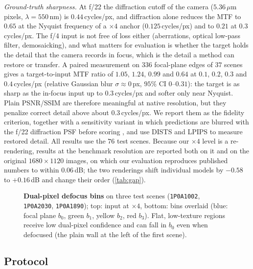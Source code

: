 \emph{Ground-truth sharpness.} At f/22 the diffraction cutoff of the camera ($5.36\,\mu$m pixels,
$\lambda=550$\,nm) is $0.44$\,cycles/px, and diffraction alone reduces the MTF to $0.65$ at the
Nyquist frequency of a $\times4$ anchor ($0.125$\,cycles/px) and to $0.21$ at $0.3$\,cycles/px. The
f/4 input is not free of loss either (aberrations, optical low-pass filter, demosaicking), and what
matters for evaluation is whether the target holds the detail that the camera records in focus, which
is the detail a method can restore or transfer. A paired measurement on $336$ focal-plane edges of
$37$ scenes gives a target-to-input MTF ratio of $1.05$, $1.24$, $0.99$ and $0.64$ at $0.1$, $0.2$,
$0.3$ and $0.4$\,cycles/px (relative Gaussian blur $\sigma\approx0$\,px, $95\%$ CI $0$--$0.31$): the
target is as sharp as the in-focus input up to $0.3$\,cycles/px and softer only near Nyquist. Plain
PSNR/SSIM are therefore meaningful at native resolution, but they penalize correct detail above about
$0.3$\,cycles/px. We report them as the fidelity criterion, together with a sensitivity variant in which
predictions are blurred with the f/22 diffraction PSF before scoring , and use
DISTS and LPIPS to measure restored detail. All results use the $76$ test scenes. Because our $\times4$ level is a re-rendering, results at the
benchmark resolution are reported both on it and on the original $1680\times1120$ images, on which our
evaluation reproduces published numbers to within $0.06$\,dB; the two renderings shift individual
models by $-0.58$ to $+0.16$\,dB and change their order (\cref{tab:gap}).

\begin{figure}[t]
  \centering
  
  \caption{\textbf{Dual-pixel defocus bins} on three test scenes (\texttt{1P0A1002}, \texttt{1P0A2030},
  \texttt{1P0A1890}); top: input at $\times4$, bottom: bins overlaid (blue: focal plane $b_0$, green $b_1$,
  yellow $b_2$, red $b_3$). Flat, low-texture regions receive low dual-pixel confidence and can fall in $b_0$ even when
  defocused (the plain wall at the left of the first scene).}
  \label{fig:bins}
\end{figure}

\subsection{Protocol}
\label{sec:exp_protocol}
